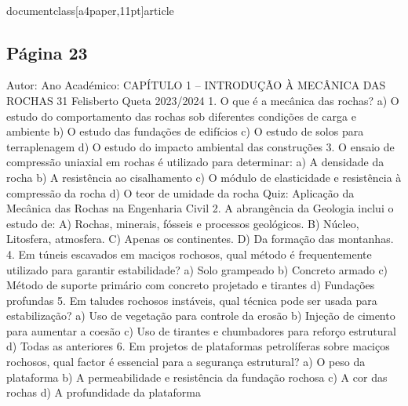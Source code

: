 \\documentclass[a4paper,11pt]{article}
\begin{document}
\subsection*{Página 23}
Autor:
Ano Académico:
CAPÍTULO 1 – INTRODUÇÃO À MECÂNICA DAS ROCHAS
31
Felisberto Queta
2023/2024
1. O que é a mecânica das rochas?
a) O estudo do comportamento das rochas sob diferentes condições de carga e ambiente
b) O estudo das fundações de edifícios
c) O estudo de solos para terraplenagem
d) O estudo do impacto ambiental das construções
3. O ensaio de compressão uniaxial em rochas é utilizado para determinar:
a) A densidade da rocha
b) A resistência ao cisalhamento
c) O módulo de elasticidade e resistência à compressão da rocha
d) O teor de umidade da rocha
Quiz: Aplicação da 
Mecânica das 
Rochas na 
Engenharia Civil
2. A abrangência da Geologia inclui o estudo de:
A) Rochas, minerais, fósseis e processos geológicos.
B) Núcleo, Litosfera, atmosfera.
C) Apenas os continentes.
D) Da formação das montanhas.
4. Em túneis escavados em maciços rochosos, qual método é frequentemente utilizado para garantir estabilidade?
a) Solo grampeado
b) Concreto armado
c) Método de suporte primário com concreto projetado e tirantes
d) Fundações profundas
5. Em taludes rochosos instáveis, qual técnica pode ser usada para estabilização?
a) Uso de vegetação para controle da erosão
b) Injeção de cimento para aumentar a coesão
c) Uso de tirantes e chumbadores para reforço estrutural
d) Todas as anteriores
6. Em projetos de plataformas petrolíferas sobre maciços rochosos, qual factor é essencial para a segurança estrutural?
a) O peso da plataforma
b) A permeabilidade e resistência da fundação rochosa
c) A cor das rochas
d) A profundidade da plataforma
\end{document}
